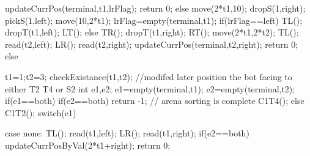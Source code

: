 {{{{{{                    	updateCurrPos(terminal,t1,lrFlag);
                    }
                    return 0;
                }
            }
            else
            {
                move(2*t1,10);
                dropS(1,right);
                pickS(1,left);
                move(10,2*t1);
                lrFlag=empty(terminal,t1);
                if(lrFlag==left)
                {
                    TL();
                    dropT(t1,left);
                    LT();
                }
                else
                {
                    TR();
                    dropT(t1,right);
                    RT();
                }
                move(2*t1,2*t2);
                TL();
                read(t2,left);
                LR();
                read(t2,right);
                updateCurrPos(terminal,t2,right);
                return 0;
            }
        }
    }
    else
    {
        t1=1;t2=3;
        checkExistance(t1,t2); //modifed later position the bot facing to either T2 T4 or S2
        int e1,e2;
        e1=empty(terminal,t1);
        e2=empty(terminal,t2);
        if(e1==both)
        {
            if(e2==both)
            return -1; // arena sorting is complete
            C1T4();
        }
        else
            C1T2();
        switch(e1)
        {
            case none:
                TL();
                read(t1,left);
                LR();
                read(t1,right);
                if(e2==both)
                {
                    updateCurrPosByVal(2*t1+right);
                    return 0;
                }
                

}}}
